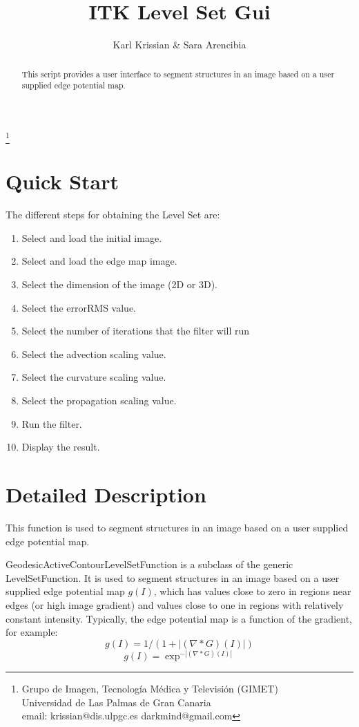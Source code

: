 \documentclass{article}
\begin{document}
\title{ITK Level Set Gui}
\author{Karl Krissian \& Sara Arencibia}
\thanks{
Grupo de Imagen, Tecnolog\'ia M\'edica y Televisi\'on (GIMET)\\
Universidad de Las Palmas de Gran Canaria\\
email: krissian@dis.ulpgc.es darkmind@gmail.com
}


\maketitle

\begin{abstract}
This script provides a user interface to segment structures in an image based on a user supplied edge potential map.
\end{abstract}


\section{Quick Start}

The different steps for obtaining the Level Set are:
\begin{enumerate}
  \item Select and load the initial image.
  \item Select and load the edge map image.
  \item Select the dimension of the image (2D or 3D).
  \item Select the errorRMS value.
  \item Select the number of iterations that the filter will run
  \item Select the advection scaling value.
  \item Select the curvature scaling value.
  \item Select the propagation scaling value.
  \item Run the filter.
  \item Display the result.
\end{enumerate}


\section{Detailed Description}
This function is used to segment structures in an image based on a user supplied edge potential map.


GeodesicActiveContourLevelSetFunction is a subclass of the generic LevelSetFunction. It is used to segment structures in an image based on a user supplied edge potential map $ g(I) $, which has values close to zero in regions near edges (or high image gradient) and values close to one in regions with relatively constant intensity. Typically, the edge potential map is a function of the gradient, for example:
\[ g(I) = 1/(1+|(\nabla\ast G)(I)|) \]
\[ g(I) = \exp^{-|(\nabla\ast G)(I)|} \]
\end{document}
